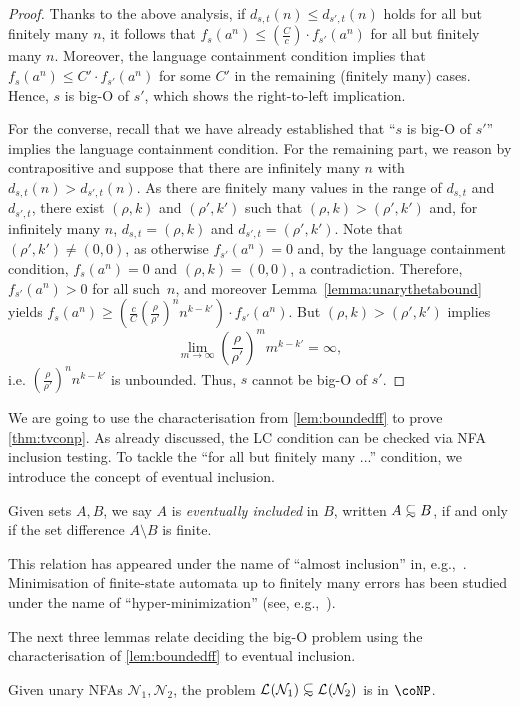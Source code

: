 \documentclass{lmcs}
\theoremstyle{plain}
\theoremstyle{definition}
\theoremstyle{remark}
\newcommand\lng[2]{\mathcal{L}_{#1}(#2)}
\newcommand\dgf{d}
\newcommand\nfa{\mathcal{N}}
\renewcommand\nu{f}
\newcommand\abfsubset{\mathrel{{\ooalign{\hss\raisebox{-0.6ex}{\small$\sim$}\hss\cr\raisebox{0.4ex}{$\subset$}}}}
}
\begin{document}
\begin{proof}
Thanks to the above analysis,
if $\dgf_{s,t} (n) \le \dgf_{s',t}(n)$ holds for all but finitely many $n$, it follows that ${\nu_s(a^n)}\le (\frac{C}{c}) \cdot{\nu_{s'}(a^n)}$ for all but finitely many $n$.
Moreover, the language containment condition implies that $\nu_s(a^n)\le C'\cdot {\nu_{s'}(a^n)}$  for some $C'$ in the remaining (finitely many) cases.
Hence, $s$ is big-O of $s'$, which shows the right-to-left implication.

For the converse, recall that we have already established that ``$s$ is big-O of $s'$'' implies the language containment condition.
For the remaining part, we reason by contrapositive and suppose  that there are infinitely many $n$ with $\dgf_{s,t}(n) > \dgf_{s',t}(n)$.
As there are finitely many values in the range of $\dgf_{s,t}$ and $\dgf_{s',t}$,
there exist $(\rho,k)$ and $(\rho',k')$ such that $(\rho,k)>(\rho',k')$ and, for infinitely many $n$, $\dgf_{s,t}=(\rho,k)$ and $\dgf_{s',t}=(\rho',k')$.
Note that $(\rho',k') \ne (0,0)$, as otherwise $f_{s'}(a^n) = 0$ and,
by the language containment condition, $f_s(a^n) = 0$ and $(\rho, k) = (0, 0)$, a contradiction.
Therefore, $f_{s'}(a^n) > 0$ for all such~$n$, and moreover
Lemma~\ref{lemma:unarythetabound} yields $\nu_s(a^n) \ge (\frac{c}{C}(\frac{\rho}{\rho'})^n n^{k-k'})\cdot\nu_{s'}(a^n)$.
But $(\rho,k)>(\rho',k')$ implies
\[\lim_{m\to\infty} \left(\frac{\rho}{\rho'}\right)^m m^{k-k'} = \infty,
\]
 i.e. $(\frac{\rho}{\rho'})^n n^{k-k'}$ is unbounded.
Thus, $s$ cannot be big-O of $s'$.
\end{proof}

We are going to use the characterisation from \cref{lem:boundedff} to prove \cref{thm:tvconp}.
As already discussed, the LC condition can be checked via NFA inclusion testing. To tackle the ``for all but finitely many ...'' condition,
we introduce the concept of  {eventual inclusion}.

\begin{defi} Given sets $A,B$, we say $A$ is \textit{eventually included} in $B$,
written $A \abfsubset B$, if and only if the set difference $A \setminus B$ is finite.
\end{defi}

This relation has appeared under the name of ``almost inclusion'' in,
e.g.,~\cite{Senizergues93,FinkelT10,IanovskiMNN14}.
Minimisation of finite-state automata up to finitely many errors has been
studied under the name of ``hyper-minimization'' (see, e.g.,~\cite{BadrGS09,Maletti11}).

The next three lemmas relate deciding the big-O problem using the characterisation of  \cref{lem:boundedff} to eventual inclusion.
\begin{lem}\label{thm:abfsubsetconpbounded}
Given unary NFAs $\nfa_1, \nfa_2$, the problem $\lng{}{\nfa_1} \abfsubset \lng{}{\nfa_2}$ is in $\coNP$.
\end{lem}
\end{document}
